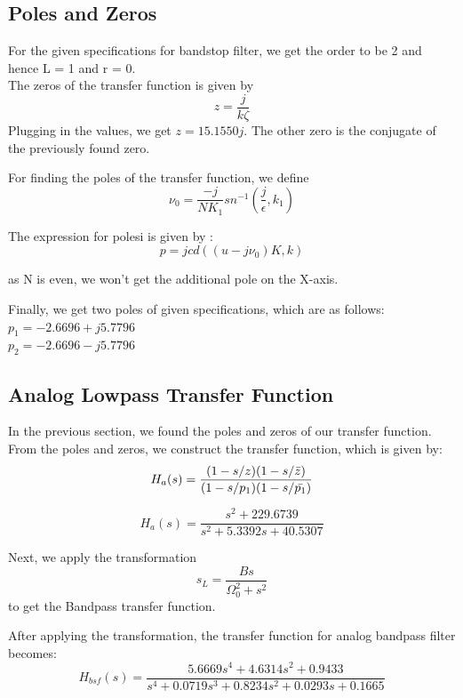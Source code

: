 \documentclass{article}
\begin{document}
\subsection{Poles and Zeros}

For the given specifications for bandstop filter, we get the order to be 2 and hence L = 1 and r = 0.\\
The zeros of the transfer function is given by \\
\begin{equation}
    z = \frac{j}{k\zeta}
\end{equation}
Plugging in the values, we get $z = 15.1550j$. The other zero is the conjugate of the previously found zero.

For finding the poles of the transfer function, we define 
\begin{equation}
    \nu_{0} = \frac{-j}{NK_{1}}sn^{-1}(\frac{j}{\epsilon},k_{1})
\end{equation}

The expression for polesi is given by :
\begin{equation}
    p = jcd((u-j\nu_{0})K, k)
\end{equation}

as N is even, we won't get the additional pole on the X-axis.

Finally, we get two poles of given specifications, which are as follows:
$p_{1} = -2.6696 + j5.7796$\\
$p_{2} = -2.6696 - j5.7796$

\subsection{Analog Lowpass Transfer Function}
In the previous section, we found the poles and zeros of our transfer function. From the poles and zeros, we construct the transfer function, which is given by:\\
\begin{equation}
    H_{a}(s) = \frac{(1-s/z)(1-s/\Bar{z})}{(1-s/p_{1})(1-s/\Bar{p_{1}})}
\end{equation}

\begin{equation}
    H_{a}(s) = \frac{s^{2}+229.6739}{s^{2} + 5.3392s + 40.5307}
\end{equation}

Next, we apply the transformation \[s_{L} = \frac{Bs}{\Omega_{0}^2 + s^2}\] to get the Bandpass transfer function. 

After applying the transformation, the transfer function for analog bandpass filter becomes:
\begin{equation}
    H_{bsf}(s) = \frac{5.6669s^{4}+4.6314s^{2}+0.9433}{s^{4} + 0.0719s^{3} + 0.8234s^{2} + 0.0293s + 0.1665}
\end{equation}
\end{document}
